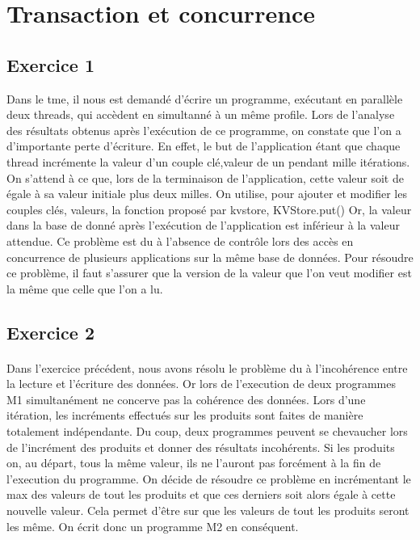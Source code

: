 \section{Transaction et concurrence}

\subsection{Exercice 1}
Dans le tme, il nous est demandé d'écrire un programme, exécutant en parallèle deux threads, qui accèdent en simultanné à un même profile.
Lors de l'analyse des résultats obtenus après l'exécution de ce programme, on constate que l'on a d'importante perte d'écriture. En effet, le but de l'application étant que chaque thread incrémente la valeur d'un couple clé,valeur de un pendant mille itérations. On s'attend à ce que, lors de la terminaison de l'application, cette valeur soit de égale à sa valeur initiale plus deux milles. On utilise, pour ajouter et modifier les couples {clés, valeurs}, la fonction proposé par kvstore, KVStore.put()
Or, la valeur dans la base de donné après l'exécution de l'application est inférieur à la valeur attendue.
Ce problème est du à l'absence de contrôle lors des accès en concurrence de plusieurs applications sur la même base de données.
Pour résoudre ce problème, il faut s'assurer que la version de la valeur que l'on veut modifier est la même que celle que l'on a lu.

\subsection{Exercice 2}
\paragraph{}
Dans l'exercice précédent, nous avons résolu le problème du à l'incohérence entre la lecture et l'écriture des données. Or lors de l'execution de deux programmes M1 simultanément ne concerve pas la cohérence des données. Lors d'une itération, les incréments effectués sur les produits sont faites de manière totalement indépendante. Du coup, deux programmes peuvent se chevaucher lors de l'incrément des produits et donner des résultats incohérents. Si les produits on, au départ, tous la même valeur, ils ne l'auront pas forcément à la fin de l'execution du programme. 
On décide de résoudre ce problème en incrémentant le max des valeurs de tout les produits et que ces derniers soit alors égale à cette nouvelle valeur. Cela permet d'être sur que les valeurs de tout les produits seront les même. On écrit donc un programme M2 en conséquent.

